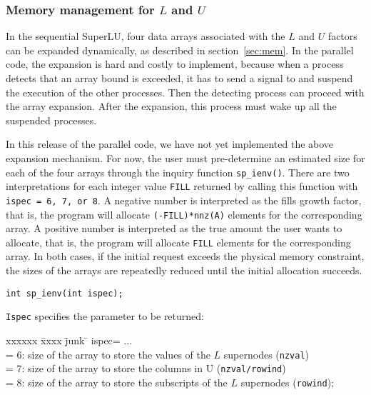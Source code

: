 \subsubsection{Memory management for $L$ and $U$}
\label{sec:mt_mem}
In the sequential SuperLU, four data arrays associated with the $L$
and $U$ factors can be expanded dynamically, as described in 
section~\ref{sec:mem}. 
In the parallel code, the expansion is hard and costly to implement, 
because when a process detects that an array bound is exceeded, it has to send
a signal to and suspend the execution of the other processes. Then
the detecting process can proceed with the array expansion. After the
expansion, this process must wake up all the suspended processes.

In this release of the parallel code, 
we have not yet implemented the above expansion mechanism.
For now, the user must pre-determine an 
estimated size for each of the four arrays through the inquiry function
{\tt sp\_ienv()}. There are two interpretations for each 
integer value {\tt FILL} returned by calling this function with 
{\tt ispec = 6, 7, or 8}.
A negative number is interpreted as the fills growth factor, that is,
the program will allocate {\tt (-FILL)*nnz(A)} elements for the corresponding
array. A positive number is interpreted as the true amount
the user wants to allocate, that is, the program will allocate
{\tt FILL} elements for the corresponding array.
In both cases, if the initial request exceeds the physical memory constraint,
the sizes of the arrays are repeatedly reduced until the initial
allocation succeeds.

\vspace{.1in}
{\tt int sp\_ienv(int ispec);}
\vspace{.1in}

{\tt Ispec} specifies the parameter to be returned:
\begin{tabbing}
xxxxxx \= xxxx \= junk \= \kill
\>ispec\>= $\ldots$ \\
\>     \>= 6: size of the array to store the values of the $L$ supernodes ({\tt nzval})\\
\>     \>= 7: size of the array to store the columns in U ({\tt nzval/rowind})\\
\>     \>= 8: size of the array to store the subscripts of the $L$ supernodes ({\tt rowind});
\end{tabbing}	    

